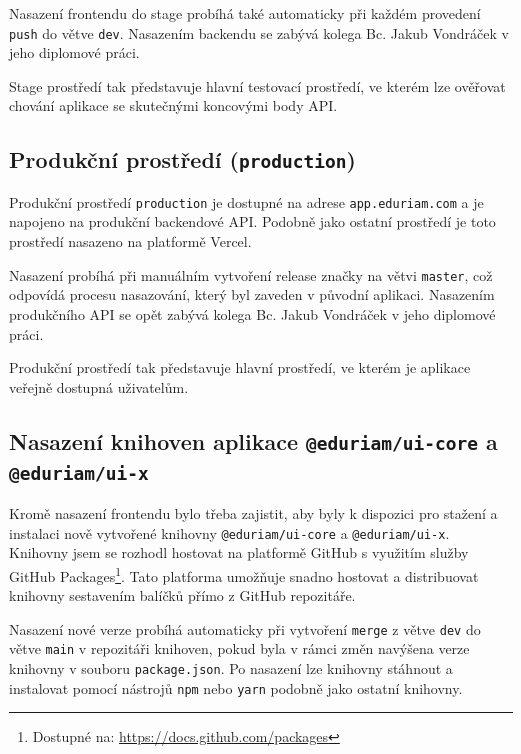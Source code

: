 Nasazení frontendu do stage probíhá také automaticky při každém provedení \texttt{push} do větve \texttt{dev}. Nasazením backendu se zabývá kolega Bc. Jakub Vondráček v jeho diplomové práci.

Stage prostředí tak představuje hlavní testovací prostředí, ve kterém lze ověřovat chování aplikace se skutečnými koncovými body API.

\subsection{Produkční prostředí (\texttt{production})}

Produkční prostředí \texttt{production} je dostupné na adrese \texttt{app.eduriam.com} a je napojeno na produkční backendové API. Podobně jako ostatní prostředí je toto prostředí nasazeno na platformě Vercel.

Nasazení probíhá při manuálním vytvoření release značky na větvi \texttt{master}, což odpovídá procesu nasazování, který byl zaveden v původní aplikaci. Nasazením produkčního API se opět zabývá kolega Bc. Jakub Vondráček v jeho diplomové práci.

Produkční prostředí tak představuje hlavní prostředí, ve kterém je aplikace veřejně dostupná uživatelům.

\subsection{Nasazení knihoven aplikace \texttt{@eduriam/ui-core} a \texttt{@eduriam/ui-x}}

Kromě nasazení frontendu bylo třeba zajistit, aby byly k dispozici pro stažení a instalaci nově vytvořené knihovny \texttt{@eduriam/ui-core} a \texttt{@eduriam/ui-x}. Knihovny jsem se rozhodl hostovat na platformě GitHub s využitím služby GitHub Packages\footnote{Dostupné na: \href{https://docs.github.com/packages}{https://docs.github.com/packages}}. Tato platforma umožňuje snadno hostovat a distribuovat knihovny sestavením balíčků přímo z GitHub repozitáře. 

Nasazení nové verze probíhá automaticky při vytvoření \texttt{merge} z větve \texttt{dev} do větve \texttt{main} v repozitáři knihoven, pokud byla v rámci změn navýšena verze knihovny v souboru \texttt{package.json}. Po nasazení lze knihovny stáhnout a instalovat pomocí nástrojů \texttt{npm} nebo \texttt{yarn} podobně jako ostatní knihovny.
